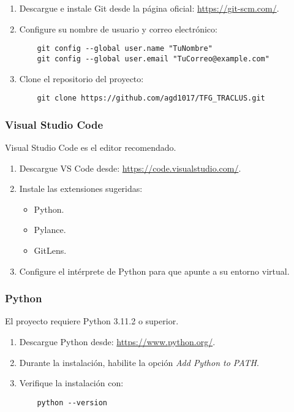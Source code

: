 \begin{enumerate}
    \item Descargue e instale Git desde la página oficial: \url{https://git-scm.com/}.
    \item Configure su nombre de usuario y correo electrónico:
    \begin{verbatim}
    git config --global user.name "TuNombre"
    git config --global user.email "TuCorreo@example.com"
    \end{verbatim}
    \item Clone el repositorio del proyecto:
    \begin{verbatim}
    git clone https://github.com/agd1017/TFG_TRACLUS.git
    \end{verbatim}
\end{enumerate}

\subsubsection{Visual Studio Code}
Visual Studio Code es el editor recomendado.

\begin{enumerate}
    \item Descargue VS Code desde: \url{https://code.visualstudio.com/}.
    \item Instale las extensiones sugeridas:
    \begin{itemize}
        \item Python.
        \item Pylance.
        \item GitLens.
    \end{itemize}
    \item Configure el intérprete de Python para que apunte a su entorno virtual.
\end{enumerate}

\subsubsection{Python}
El proyecto requiere Python 3.11.2 o superior.

\begin{enumerate}
    \item Descargue Python desde: \url{https://www.python.org/}.
    \item Durante la instalación, habilite la opción \textit{Add Python to PATH}.
    \item Verifique la instalación con:
    \begin{verbatim}
    python --version
    \end{verbatim}
\end{enumerate}

